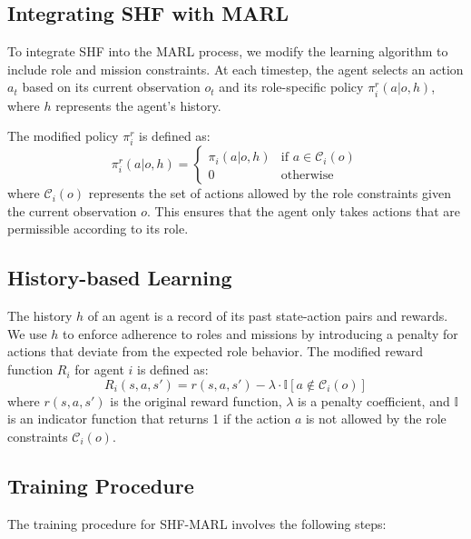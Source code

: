 \documentclass[sigconf,anonymous]{aamas}
\begin{document}
\subsection{Integrating SHF with MARL}
To integrate SHF into the MARL process, we modify the learning algorithm to include role and mission constraints. At each timestep, the agent selects an action $a_t$ based on its current observation $o_t$ and its role-specific policy $\pi_i^r(a | o, h)$, where $h$ represents the agent's history.

The modified policy $\pi_i^r$ is defined as:
\[
\pi_i^r(a | o, h) = 
\begin{cases}
\pi_i(a | o, h) & \text{if } a \in \mathcal{C}_i(o) \\
0 & \text{otherwise}
\end{cases}
\]
where $\mathcal{C}_i(o)$ represents the set of actions allowed by the role constraints given the current observation $o$. This ensures that the agent only takes actions that are permissible according to its role.

\subsection{History-based Learning}
The history $h$ of an agent is a record of its past state-action pairs and rewards. We use $h$ to enforce adherence to roles and missions by introducing a penalty for actions that deviate from the expected role behavior. The modified reward function $R_i$ for agent $i$ is defined as:
\[
R_i(s, a, s') = r(s, a, s') - \lambda \cdot \mathbb{I}[a \notin \mathcal{C}_i(o)]
\]
where $r(s, a, s')$ is the original reward function, $\lambda$ is a penalty coefficient, and $\mathbb{I}$ is an indicator function that returns 1 if the action $a$ is not allowed by the role constraints $\mathcal{C}_i(o)$.

\subsection{Training Procedure}
The training procedure for SHF-MARL involves the following steps:
\end{document}
